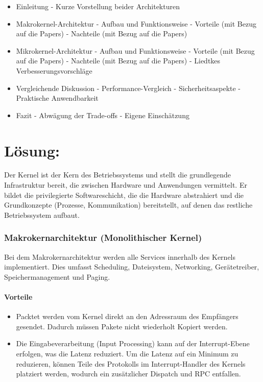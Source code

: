 \documentclass{article}
\begin{document}
\begin{itemize}
   \item Einleitung - Kurze Vorstellung beider Architekturen 
   \item Makrokernel-Architektur - Aufbau und Funktionsweise - Vorteile (mit Bezug auf die Papers) - Nachteile (mit Bezug auf die Papers) 
   \item Mikrokernel-Architektur - Aufbau und Funktionsweise - Vorteile (mit Bezug auf die Papers) - Nachteile (mit Bezug auf die Papers) - Liedtkes Verbesserungsvorschläge 
   \item Vergleichende Diskussion - Performance-Vergleich - Sicherheitsaspekte - Praktische Anwendbarkeit 
   \item Fazit - Abwägung der Trade-offs - Eigene Einschätzung
\end{itemize}

\section*{Lösung: }

\noindent
Der Kernel ist der Kern des Betriebssystems und stellt die grundlegende Infrastruktur bereit, die
zwischen Hardware und Anwendungen vermittelt. Er bildet die privilegierte Softwareschicht,
die die Hardware abstrahiert und die Grundkonzepte (Prozesse, Kommunikation) bereitstellt,
auf denen das restliche Betriebssystem aufbaut.

\subsubsection*{Makrokernarchitektur (Monolithischer Kernel)}

\noindent
Bei dem Makrokernarchitektur werden alle Services innerhalb des Kernels implementiert. Dies umfasst Scheduling, Dateisystem, Networking, Gerätetreiber, Speichermanagement und Paging.

\paragraph{Vorteile}
\begin{itemize}
   \item Packtet werden vom Kernel direkt an den Adressraum des Empfängers gesendet. Dadurch müssen Pakete nicht wiederholt Kopiert werden. 
   \item Die Eingabeverarbeitung (Input Processing) kann auf der Interrupt-Ebene erfolgen, was die Latenz reduziert. Um die Latenz auf ein Minimum zu reduzieren, können Teile des Protokolls im Interrupt-Handler des Kernels platziert werden, wodurch ein zusätzlicher Dispatch und RPC entfallen.
\end{itemize}
\end{document}
